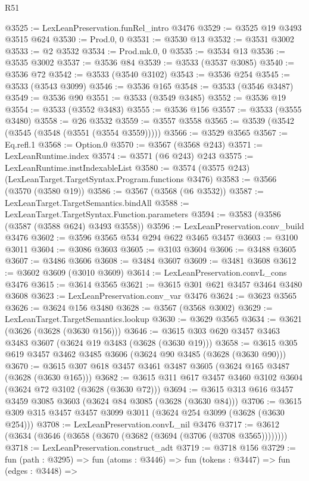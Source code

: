\begin{lexlean}{R51}
\begin{coremodule}
@3525 := LexLeanPreservation.funRel_intro @3476
@3529 := @3525 @19 @3493 @3515 @624
@3530 := Prod.{0, 0}
@3531 := @3530 @13
@3532 := @3531 @3002
@3533 := @2 @3532
@3534 := Prod.mk.{0, 0}
@3535 := @3534 @13
@3536 := @3535 @3002
@3537 := @3536 @84
@3539 := @3533 (@3537 @3085)
@3540 := @3536 @72
@3542 := @3533 (@3540 @3102)
@3543 := @3536 @254
@3545 := @3533 (@3543 @3099)
@3546 := @3536 @165
@3548 := @3533 (@3546 @3487)
@3549 := @3536 @90
@3551 := @3533 (@3549 @3485)
@3552 := @3536 @19
@3554 := @3533 (@3552 @3483)
@3555 := @3536 @156
@3557 := @3533 (@3555 @3480)
@3558 := @26 @3532
@3559 := @3557 @3558
@3565 := @3539 (@3542 (@3545 (@3548 (@3551 (@3554 @3559)))))
@3566 := @3529 @3565
@3567 := Eq.refl.{1}
@3568 := Option.{0}
@3570 := @3567 (@3568 @243)
@3571 := LexLeanRuntime.index
@3574 := @3571 (@6 @243) @243
@3575 := LexLeanRuntime.instIndexableList
@3580 := @3574 (@3575 @243) (LexLeanTarget.TargetSyntax.Program.functions @3476)
@3583 := @3566 (@3570 (@3580 @19))
@3586 := @3567 (@3568 (@6 @3532))
@3587 := LexLeanTarget.TargetSemantics.bindAll
@3588 := LexLeanTarget.TargetSyntax.Function.parameters
@3594 := @3583 (@3586 (@3587 (@3588 @624) @3493 @3558))
@3596 := LexLeanPreservation.conv_build @3476
@3602 := @3596 @3565 @534 @294 @622 @3465 @3457
@3603 := @3100 @3011
@3604 := @3086 @3603
@3605 := @3103 @3604
@3606 := @3488 @3605
@3607 := @3486 @3606
@3608 := @3484 @3607
@3609 := @3481 @3608
@3612 := @3602 @3609 (@3010 @3609)
@3614 := LexLeanPreservation.convL_cons @3476
@3615 := @3614 @3565
@3621 := @3615 @301 @621 @3457 @3464 @3480 @3608
@3623 := LexLeanPreservation.conv_var @3476
@3624 := @3623 @3565
@3626 := @3624 @156 @3480
@3628 := @3567 (@3568 @3002)
@3629 := LexLeanTarget.TargetSemantics.lookup
@3630 := @3629 @3565
@3634 := @3621 (@3626 (@3628 (@3630 @156)))
@3646 := @3615 @303 @620 @3457 @3463 @3483 @3607 (@3624 @19 @3483 (@3628 (@3630 @19)))
@3658 := @3615 @305 @619 @3457 @3462 @3485 @3606 (@3624 @90 @3485 (@3628 (@3630 @90)))
@3670 := @3615 @307 @618 @3457 @3461 @3487 @3605 (@3624 @165 @3487 (@3628 (@3630 @165)))
@3682 := @3615 @311 @617 @3457 @3460 @3102 @3604 (@3624 @72 @3102 (@3628 (@3630 @72)))
@3694 := @3615 @313 @616 @3457 @3459 @3085 @3603 (@3624 @84 @3085 (@3628 (@3630 @84)))
@3706 := @3615 @309 @315 @3457 @3457 @3099 @3011 (@3624 @254 @3099 (@3628 (@3630 @254)))
@3708 := LexLeanPreservation.convL_nil @3476
@3717 := @3612 (@3634 (@3646 (@3658 (@3670 (@3682 (@3694 (@3706 (@3708 @3565))))))))
@3718 := LexLeanPreservation.construct_adt
@3719 := @3718 @156
@3729 := fun (path : @3295) =>
  fun (atoms : @3446) =>
  fun (tokens : @3447) =>
  fun (edges : @3448) =>

\end{coremodule}
\end{lexlean}
